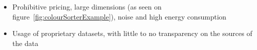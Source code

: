 \begin{itemize}

	\item Prohibitive pricing, large dimensions (as seen on figure~\ref{fig:colourSorterExample}), noise and high energy consumption

	\item Usage of proprietary datasets, with little to no transparency on the sources of the data


\end{itemize}
